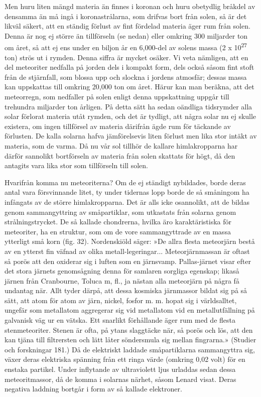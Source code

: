 \documentclass[a4paper, 12pt, oneside, swedish]{article}
\begin{document}
Men huru liten mängd materia än finnes i koronan och huru obetydlig bråkdel av densamma än må ingå i koronastrålarna, som drifvas bort från solen, så är det likväl säkert, att en ständig förlust av fint fördelad materia äger rum från solen. Denna är nog ej större än tillförseln (se nedan) eller omkring 300 miljarder ton om året, så att ej ens under en biljon år en 6,000-del av solens massa (2 x 10\textsuperscript{27} ton) strös ut i rymden. Denna siffra är mycket osäker. Vi veta nämligen, att en del meteoriter nedfalla på jorden dels i kompakt form, dels också såsom fint stoft från de stjärnfall, som blossa upp och slockna i jordens atmosfär; dessas massa kan uppskattas till omkring 20,000 ton om året. Härur kan man beräkna, att det meteorregn, som nedfaller på solen enligt denna uppskattning uppgår till trehundra miljarder ton årligen. På detta sätt ha sedan oändliga tidsrymder alla solar förlorat materia utåt rymden, och det är tydligt, att några solar nu ej skulle existera, om ingen tillförsel av materia därifrån ägde rum för täckande av förlusten. De kalla solarna hafva jämförelsevis liten förlust men lika stor intäkt av materia, som de varma. Då nu vår sol tillhör de kallare himlakropparna har därför sannolikt bortförseln av materia från solen skattats för högt, då den antagits vara lika stor som tillförseln till solen.

Hvarifrån komma nu meteoriterna? Om de ej ständigt nybildades, borde deras antal vara försvinnande litet, ty under tidernas lopp borde de så småningom ha infångats av de större himlakropparna. Det är alls icke osannolikt, att de bildas genom sammangyttring av småpartiklar, som utkastats från solarna genom strålningstrycket. De så kallade chondrerna, hvilka äro karaktäristiska för meteoriter, ha en struktur, som om de vore sammangyttrade av en massa ytterligt små korn (fig. 32). Nordenskiöld säger: »De allra flesta meteorjärn bestå av en ytterst fin väfnad av olika metall-legeringar... Meteorjärnmassan är oftast så porös att den oxiderar sig i luften som en järnsvamp. Pallas-järnet visar efter det stora järnets genomsågning denna för samlaren sorgliga egenskap; likaså järnen från Cranbourne, Toluca m, fl., ja nästan alla meteorjärn på några få undantag när. Allt tyder därpå, att dessa kosmiska järnmassor bildat sig på så sätt, att atom för atom av järn, nickel, fosfor m. m. hopat sig i världsalltet, ungefär som metallatom aggregerar sig vid metallatom vid en metallutfällning på galvanisk väg ur en vätska. Ett snarlikt förhållande äger rum med de flesta stenmeteoriter. Stenen är ofta, på ytans slaggtäcke när, så porös och lös, att den kan tjäna till filtrersten och lätt låter söndersmula sig mellan fingrarna.» (Studier och forskningar 181.) Då de elektriskt laddade småpartiklarna sammangyttra sig, växer deras elektriska spänning från ett ringa värde (omkring 0,02 volt) för en enstaka partikel. Under inflytande av ultraviolett ljus urladdas sedan dessa meteoritmassor, då de komma i solarnas närhet, såsom Lenard visat. Deras negativa laddning bortgår i form av så kallade elektroner.
\end{document}
